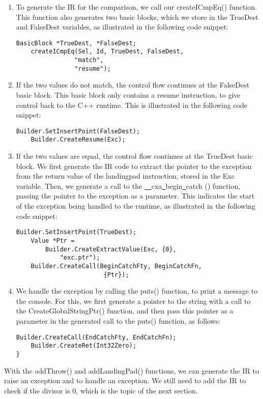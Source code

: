 \begin{enumerate}
\item To generate the IR for the comparison, we call our createICmpEq() function. This function also generates two basic blocks, which we store in the TrueDest and FalseDest variables, as illustrated in the following code snippet:
\begin{lstlisting}[caption={}]
	BasicBlock *TrueDest, *FalseDest;
	createICmpEq(Sel, Id, TrueDest, FalseDest, 
				"match",
				"resume");
\end{lstlisting}

\item If the two values do not match, the control flow continues at the FalseDest basic block. This basic block only contains a resume instruction, to give control back to the C++ runtime. This is illustrated in the following code snippet:
\begin{lstlisting}[caption={}]
	Builder.SetInsertPoint(FalseDest);
	Builder.CreateResume(Exc);
\end{lstlisting}

\item If the two values are equal, the control flow continues at the TrueDest basic block. We first generate the IR code to extract the pointer to the exception from the return value of the landingpad instruction, stored in the Exc variable. Then, we generate a call to the \underline{~~}cxa\underline{~}begin\underline{~}catch () function, passing the pointer to the exception as a parameter. This indicates the start of the exception being handled to the runtime, as illustrated in the following code snippet:
\begin{lstlisting}[caption={}]
	Builder.SetInsertPoint(TrueDest);
	Value *Ptr =
		Builder.CreateExtractValue(Exc, {0}, 
			"exc.ptr");
	Builder.CreateCall(BeginCatchFty, BeginCatchFn,
						{Ptr});
\end{lstlisting}

\item We handle the exception by calling the puts() function, to print a message to the console. For this, we first generate a pointer to the string with a call to the CreateGlobalStringPtr() function, and then pass this pointer as a parameter in the generated call to the puts() function, as follows:
\begin{lstlisting}[caption={}]
	Builder.CreateCall(EndCatchFty, EndCatchFn);
	Builder.CreateRet(Int32Zero);
}
\end{lstlisting}
\end{enumerate}

With the addThrow() and addLandingPad() functions, we can generate the IR to raise an exception and to handle an exception. We still need to add the IR to check if the divisor is 0, which is the topic of the next section.\par

